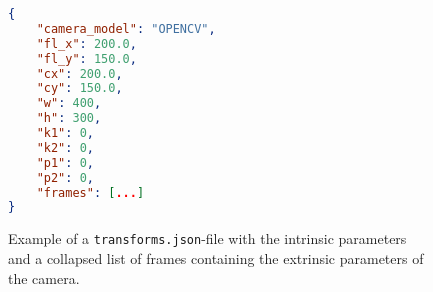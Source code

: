 \begin{figure}[ht]
\centering
\begin{lstlisting}[language=json,linewidth=0.9\linewidth]
{
    "camera_model": "OPENCV",
    "fl_x": 200.0,
    "fl_y": 150.0,
    "cx": 200.0,
    "cy": 150.0,
    "w": 400,
    "h": 300,
    "k1": 0,
    "k2": 0,
    "p1": 0,
    "p2": 0,
    "frames": [...]
}
\end{lstlisting}
\caption[Example of a \texttt{transforms.json}-file]{Example of a \texttt{transforms.json}-file with the intrinsic parameters and a collapsed list of frames containing the extrinsic parameters of the camera.}
\label{code:transform-examples}
\end{figure}
